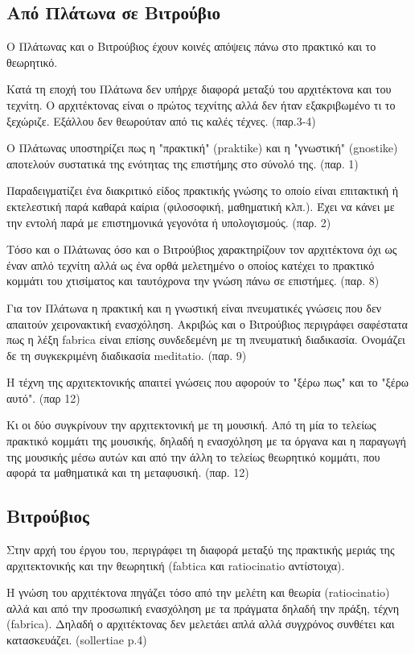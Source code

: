 \subsection{Από Πλάτωνα σε Βιτρούβιο}

Ο Πλάτωνας και ο Βιτρούβιος έχουν κοινές απόψεις πάνω στο πρακτικό και το
θεωρητικό.

Κατά τη εποχή του Πλάτωνα δεν υπήρχε διαφορά μεταξύ του αρχιτέκτονα και του 
τεχνίτη. Ο αρχιτέκτονας είναι ο πρώτος τεχνίτης αλλά δεν ήταν εξακριβωμένο τι 
το ξεχώριζε. Εξάλλου δεν θεωρούταν από τις καλές τέχνες. (παρ.3-4)

Ο Πλάτωνας υποστηρίζει πως η "πρακτική" (praktike) και η "γνωστική" (gnostike) 
αποτελούν συστατικά της ενότητας της επιστήμης στο σύνολό της. (παρ. 1)

Παραδειγματίζει ένα διακριτικό είδος πρακτικής γνώσης το οποίο είναι επιτακτική
ή εκτελεστική παρά καθαρά καίρια (φιλοσοφική, μαθηματική κλπ.). Έχει να κάνει με
την εντολή παρά με επιστημονικά γεγονότα ή υπολογισμούς. (παρ. 2)

Τόσο και ο Πλάτωνας όσο και ο Βιτρούβιος χαρακτηρίζουν τον αρχιτέκτονα όχι ως 
έναν απλό τεχνίτη αλλά ως ένα ορθά μελετημένο ο οποίος κατέχει το πρακτικό 
κομμάτι του χτισίματος και ταυτόχρονα την γνώση πάνω σε επιστήμες. (παρ. 8)

Για τον Πλάτωνα η πρακτική και η γνωστική είναι πνευματικές γνώσεις που δεν 
απαιτούν χειρονακτική ενασχόληση. Ακριβώς και ο Βιτρούβιος περιγράφει 
σαφέστατα πως η λέξη fabrica είναι επίσης συνδεδεμένη με τη πνευματική 
διαδικασία. Ονομάζει δε τη συγκεκριμένη διαδικασία meditatio. (παρ. 9)

Η τέχνη της αρχιτεκτονικής απαιτεί γνώσεις που αφορούν το "ξέρω πως" και το 
"ξέρω αυτό". (παρ 12)

Κι οι δύο συγκρίνουν την αρχιτεκτονική με τη μουσική. Από τη μία το τελείως 
πρακτικό κομμάτι της μουσικής, δηλαδή η ενασχόληση με τα όργανα και η παραγωγή 
της μουσικής μέσω αυτών και από την άλλη το τελείως θεωρητικό κομμάτι, που 
αφορά τα μαθηματικά και τη μεταφυσική. (παρ. 12)

\subsection{Βιτρούβιος}

Στην αρχή του έργου του, περιγράφει τη διαφορά μεταξύ της πρακτικής μεριάς της
αρχιτεκτονικής και την θεωρητική (fabtica και ratiocinatio αντίστοιχα).

Η γνώση του αρχιτέκτονα πηγάζει τόσο από την μελέτη και θεωρία (ratiocinatio)
αλλά και από την προσωπική ενασχόληση με τα πράγματα δηλαδή την πράξη, τέχνη
(fabrica). Δηλαδή ο αρχιτέκτονας δεν μελετάει απλά αλλά συγχρόνος συνθέτει και
κατασκευάζει. (sollertiae p.4)

